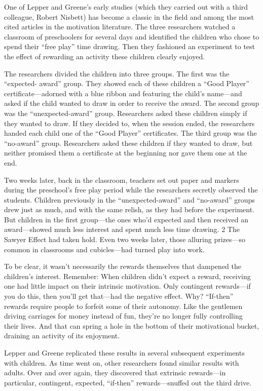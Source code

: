 One of Lepper and Greene’s early studies (which they carried out with a third colleague, Robert Nisbett) has become a classic in the field and among the most cited articles in the motivation literature. The three researchers watched a classroom of preschoolers for several days and identified the children who chose to spend their “free play” time drawing. Then they fashioned an experiment to test the effect of rewarding an activity these children clearly enjoyed.

The researchers divided the children into three groups. The first was the “expected- award” group. They showed each of these children a “Good Player” certificate—adorned with a blue ribbon and featuring the child’s name—and asked if the child wanted to draw in order to receive the award. The second group was the “unexpected-award” group. Researchers asked these children simply if they wanted to draw. If they decided to, when the session ended, the researchers handed each child one of the “Good Player” certificates. The third group was the “no-award” group. Researchers asked these children if they wanted to draw, but neither promised them a certificate at the beginning nor gave them one at the end.

Two weeks later, back in the classroom, teachers set out paper and markers during the preschool’s free play period while the researchers secretly observed the students. Children previously in the “unexpected-award” and “no-award” groups drew just as much, and with the same relish, as they had before the experiment. But children in the first group—the ones who’d expected and then received an award—showed much less interest and spent much less time drawing. 2 The Sawyer Effect had taken hold. Even two weeks later, those alluring prizes—so common in classrooms and cubicles—had turned play into work.

To be clear, it wasn’t necessarily the rewards themselves that dampened the children’s interest. Remember: When children didn’t expect a reward, receiving one had little impact on their intrinsic motivation. Only contingent rewards—if you do this, then you’ll get that—had the negative effect. Why? “If-then” rewards require people to forfeit some of their autonomy. Like the gentlemen driving carriages for money instead of fun, they’re no longer fully controlling their lives. And that can spring a hole in the bottom of their motivational bucket, draining an activity of its enjoyment.

Lepper and Greene replicated these results in several subsequent experiments with children. As time went on, other researchers found similar results with adults. Over and over again, they discovered that extrinsic rewards—in particular, contingent, expected, “if-then” rewards—snuffed out the third drive.

